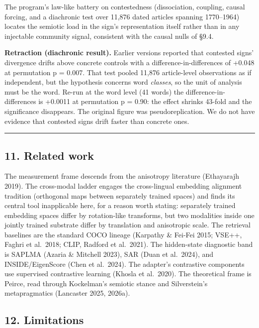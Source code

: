 \documentclass[
  11pt,
]{article}
\begin{document}
The program's law-like battery on contestedness (dissociation, coupling,
causal forcing, and a diachronic test over 11,876 dated articles
spanning 1770--1964) locates the semiotic load in the
sign's representation itself rather than in any injectable community
signal, consistent with the causal nulls of §9.4.

\textbf{Retraction (diachronic result).} Earlier versions reported that
contested signs' divergence drifts above concrete controls with a
difference-in-differences of +0.048 at permutation p = 0.007. That test
pooled 11,876 article-level observations as if independent, but the
hypothesis concerns word \emph{classes}, so the unit of analysis must be
the word. Re-run at the word level (41 words) the
difference-in-differences is +0.0011 at permutation p = 0.90: the effect
shrinks 43-fold and the significance disappears. The original figure was
pseudoreplication. We do not have evidence that contested signs drift
faster than concrete ones.

\begin{center}\rule{0.5\linewidth}{0.5pt}\end{center}

\subsection{11. Related work}\label{related-work}

The measurement frame descends from the anisotropy literature
(Ethayarajh 2019). The cross-modal ladder engages the cross-lingual
embedding alignment tradition (orthogonal maps between separately
trained spaces) and finds its central tool inapplicable here, for a
reason worth stating: separately trained embedding spaces differ by
rotation-like transforms, but two modalities inside one jointly trained
substrate differ by translation and anisotropic scale. The retrieval
baselines are the standard COCO lineage (Karpathy \& Fei-Fei 2015;
VSE++, Faghri et al.~2018; CLIP, Radford et al.~2021). The hidden-state
diagnostic band is SAPLMA (Azaria \& Mitchell 2023), SAR (Duan et
al.~2024), and INSIDE/EigenScore (Chen et al.~2024). The adapter's
contrastive components use supervised contrastive learning (Khosla et
al.~2020). The theoretical frame is Peirce, read through Kockelman's
semiotic stance and Silverstein's metapragmatics (Lancaster 2025,
2026a).

\subsection{12. Limitations}\label{limitations}
\end{document}
